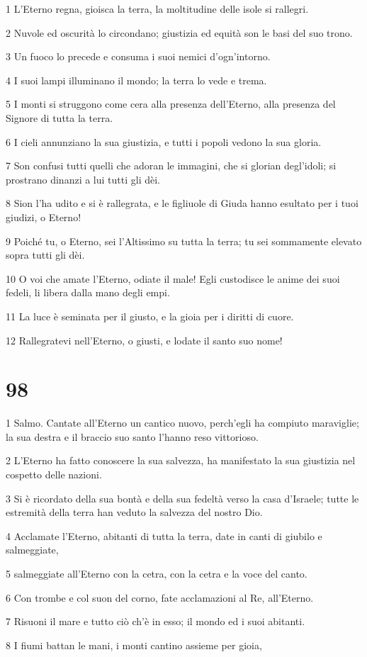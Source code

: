 \par 1 L'Eterno regna, gioisca la terra, la moltitudine delle isole si rallegri.
\par 2 Nuvole ed oscurità lo circondano; giustizia ed equità son le basi del suo trono.
\par 3 Un fuoco lo precede e consuma i suoi nemici d'ogn'intorno.
\par 4 I suoi lampi illuminano il mondo; la terra lo vede e trema.
\par 5 I monti si struggono come cera alla presenza dell'Eterno, alla presenza del Signore di tutta la terra.
\par 6 I cieli annunziano la sua giustizia, e tutti i popoli vedono la sua gloria.
\par 7 Son confusi tutti quelli che adoran le immagini, che si glorian degl'idoli; si prostrano dinanzi a lui tutti gli dèi.
\par 8 Sion l'ha udito e si è rallegrata, e le figliuole di Giuda hanno esultato per i tuoi giudizi, o Eterno!
\par 9 Poiché tu, o Eterno, sei l'Altissimo su tutta la terra; tu sei sommamente elevato sopra tutti gli dèi.
\par 10 O voi che amate l'Eterno, odiate il male! Egli custodisce le anime dei suoi fedeli, li libera dalla mano degli empi.
\par 11 La luce è seminata per il giusto, e la gioia per i diritti di cuore.
\par 12 Rallegratevi nell'Eterno, o giusti, e lodate il santo suo nome!

\chapter{98}

\par 1 Salmo. Cantate all'Eterno un cantico nuovo, perch'egli ha compiuto maraviglie; la sua destra e il braccio suo santo l'hanno reso vittorioso.
\par 2 L'Eterno ha fatto conoscere la sua salvezza, ha manifestato la sua giustizia nel cospetto delle nazioni.
\par 3 Si è ricordato della sua bontà e della sua fedeltà verso la casa d'Israele; tutte le estremità della terra han veduto la salvezza del nostro Dio.
\par 4 Acclamate l'Eterno, abitanti di tutta la terra, date in canti di giubilo e salmeggiate,
\par 5 salmeggiate all'Eterno con la cetra, con la cetra e la voce del canto.
\par 6 Con trombe e col suon del corno, fate acclamazioni al Re, all'Eterno.
\par 7 Risuoni il mare e tutto ciò ch'è in esso; il mondo ed i suoi abitanti.
\par 8 I fiumi battan le mani, i monti cantino assieme per gioia,

